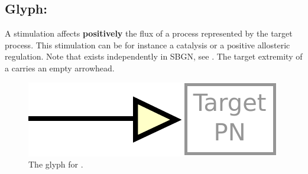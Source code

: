 
\subsection{Glyph: }\label{sec:stimulation}

A stimulation affects \textbf{positively} the flux of a process represented by the target process. This stimulation can be for instance a catalysis or a positive allosteric regulation. Note that  exists independently in SBGN, see . The target extremity of a  carries an empty arrowhead.

\begin{figure}[H]
  \centering
  \includegraphics[scale = 0.5]{images/stimulation}
  \caption{The \PD glyph for .}
  \label{fig:stimulation}
\end{figure}


